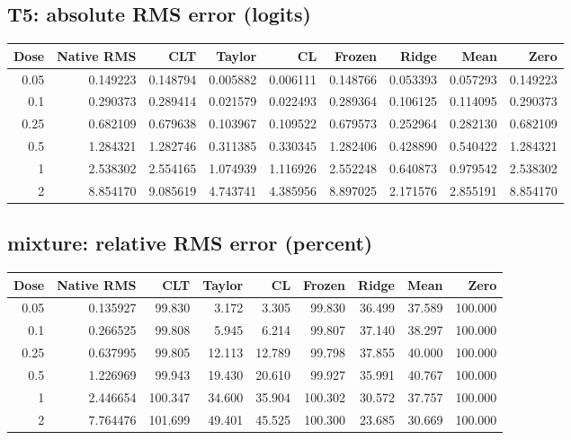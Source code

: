 \subsection{T5: absolute RMS error (logits)}
\begin{center}\scriptsize
\begin{tabular}{rrrrrrrrr}
\toprule Dose & Native RMS & CLT & Taylor & CL & Frozen & Ridge & Mean & Zero\\\midrule
0.05 & 0.149223 & 0.148794 & 0.005882 & 0.006111 & 0.148766 & 0.053393 & 0.057293 & 0.149223\\
0.1 & 0.290373 & 0.289414 & 0.021579 & 0.022493 & 0.289364 & 0.106125 & 0.114095 & 0.290373\\
0.25 & 0.682109 & 0.679638 & 0.103967 & 0.109522 & 0.679573 & 0.252964 & 0.282130 & 0.682109\\
0.5 & 1.284321 & 1.282746 & 0.311385 & 0.330345 & 1.282406 & 0.428890 & 0.540422 & 1.284321\\
1 & 2.538302 & 2.554165 & 1.074939 & 1.116926 & 2.552248 & 0.640873 & 0.979542 & 2.538302\\
2 & 8.854170 & 9.085619 & 4.743741 & 4.385956 & 8.897025 & 2.171576 & 2.855191 & 8.854170\\
\bottomrule\end{tabular}\end{center}
\subsection{mixture: relative RMS error (percent)}
\begin{center}\scriptsize
\begin{tabular}{rrrrrrrrr}
\toprule Dose & Native RMS & CLT & Taylor & CL & Frozen & Ridge & Mean & Zero\\\midrule
0.05 & 0.135927 & 99.830 & 3.172 & 3.305 & 99.830 & 36.499 & 37.589 & 100.000\\
0.1 & 0.266525 & 99.808 & 5.945 & 6.214 & 99.807 & 37.140 & 38.297 & 100.000\\
0.25 & 0.637995 & 99.805 & 12.113 & 12.789 & 99.798 & 37.855 & 40.000 & 100.000\\
0.5 & 1.226969 & 99.943 & 19.430 & 20.610 & 99.927 & 35.991 & 40.767 & 100.000\\
1 & 2.446654 & 100.347 & 34.600 & 35.904 & 100.302 & 30.572 & 37.757 & 100.000\\
2 & 7.764476 & 101.699 & 49.401 & 45.525 & 100.300 & 23.685 & 30.669 & 100.000\\
\bottomrule\end{tabular}\end{center}
